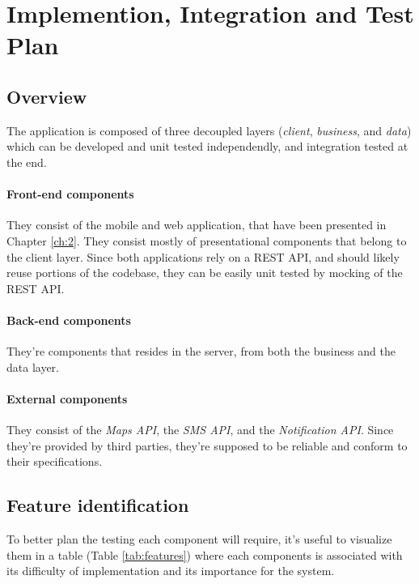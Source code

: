
\section{Implemention, Integration and Test Plan}

\subsection{Overview}

The application is composed of three decoupled layers (\emph{client}, \emph{business}, and \emph{data}) which can be developed and unit tested independendly, and integration tested at the end.

\paragraph{Front-end components} They consist of the mobile and web application, that have been presented in Chapter \ref{ch:2}. They consist mostly of presentational components that belong to the client layer. Since both applications rely on a REST API, and should likely reuse portions of the codebase, they can be easily unit tested by mocking of the REST API.

\paragraph{Back-end components} They're components that resides in the server, from both the business and the data layer.

\paragraph{External components} They consist of the \emph{Maps API}, the \emph{SMS API}, and the \emph{Notification API}. Since they're provided by third parties, they're supposed to be reliable and conform to their specifications.

\subsection{Feature identification}

To better plan the testing each component will require, it's useful to visualize them in a table (Table \ref{tab:features}) where each components is associated with its difficulty of implementation and its importance for the system.

